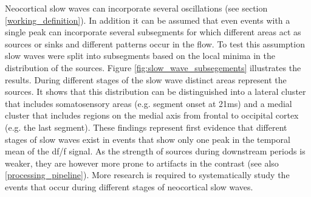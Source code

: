 Neocortical slow waves can incorporate several oscillations (see section \ref{working_definition}). In addition it can be assumed that even events with a single peak can incorporate several subsegments for which different areas act as sources or sinks and different patterns occur in the flow. To test this assumption slow waves were split into subsegments based on the local minima in the distribution of the sources. Figure \ref{fig:slow_wave_subsegements} illustrates the results. During different stages of the slow wave distinct areas represent the sources. It shows that this distribution can be distinguished into a lateral cluster that includes somatosensory areas (e.g. segment onset at 21ms) and a medial cluster that includes regions on the medial axis from frontal to occipital cortex (e.g. the last segment). These findings represent first evidence that different stages of slow waves exist in events that show only one peak in the temporal mean of the df/f signal. As the strength of sources during downstream periods is weaker, they are however more prone to artifacts in the contrast (see also \ref{processing_pipeline}). More research is required to systematically study the events that occur during different stages of neocortical slow waves.\\
